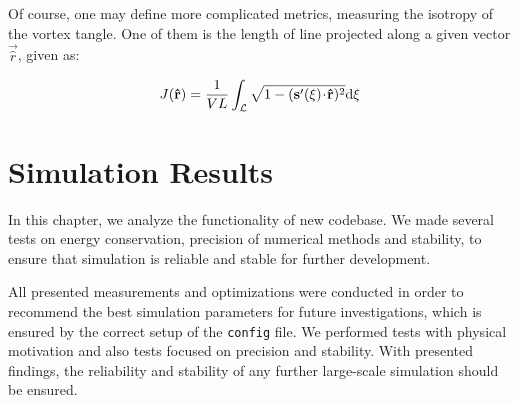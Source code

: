 Of course, one may define more complicated metrics, measuring the isotropy of the vortex tangle. One of them is the length of line projected along a given vector $\vec{\hat{r}}$, given as:

\begin{equation}
J(\mathbf{\hat{r}}) = \frac{1}{VL} \int_{\mathcal{L}} \sqrt{1 - (\mathbf{s}^{\prime}(\xi) \!\cdot\! \mathbf{\hat{r}})^2} \text{d}\xi
\end{equation}

\newpage

\chapter{Simulation Results}
%
%

In this chapter, we analyze the functionality of new codebase. We made several tests on energy conservation, precision of numerical methods and stability, to ensure that simulation is reliable and stable for further development.

All presented measurements and optimizations were conducted in order to recommend the best simulation parameters for future investigations, which is ensured by the correct setup of the \texttt{config} file. We performed tests with physical motivation and also tests focused on precision and stability. With presented findings, the reliability and stability of any further large-scale simulation should be ensured.

